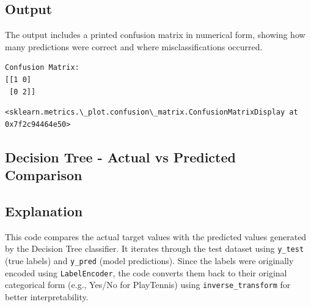 \documentclass[11pt]{article}
\makeatletter
\newcommand{\boxspacing}{\kern\kvtcb@left@rule\kern\kvtcb@boxsep}
\newcommand{\prompt}[4]{
        {\ttfamily\llap{{\color{#2}[#3]:\hspace{3pt}#4}}\vspace{-\baselineskip}}
    }
\makeatother
\begin{document}
\subsection*{Output}
The output includes a printed confusion matrix in numerical form, showing how many predictions were correct and where misclassifications occurred. 
\begin{Verbatim}[commandchars=\\\{\}]
Confusion Matrix:
[[1 0]
 [0 2]]
\end{Verbatim}

            \begin{tcolorbox}[breakable, size=fbox, boxrule=.5pt, pad at break*=1mm, opacityfill=0]
\prompt{Out}{outcolor}{11}{\boxspacing}
\begin{Verbatim}[commandchars=\\\{\}]
<sklearn.metrics.\_plot.confusion\_matrix.ConfusionMatrixDisplay at
0x7f2c94464e50>
\end{Verbatim}
\end{tcolorbox}
        
    \begin{center}
    \end{center}
 
    
\subsection{Decision Tree - Actual vs Predicted Comparison}

\subsection*{Explanation}
This code compares the actual target values with the predicted values generated by the Decision Tree classifier. It iterates through the test dataset using \texttt{y\_test} (true labels) and \texttt{y\_pred} (model predictions). Since the labels were originally encoded using \texttt{LabelEncoder}, the code converts them back to their original categorical form (e.g., Yes/No for PlayTennis) using \texttt{inverse\_transform} for better interpretability.
\end{document}
